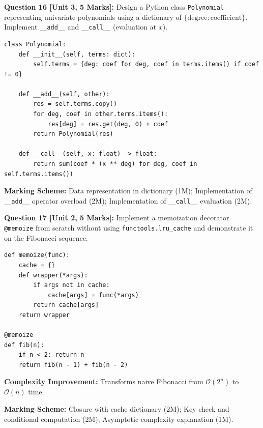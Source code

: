 \noindent\textbf{Question 16 [Unit 3, 5 Marks]:} Design a Python class \texttt{Polynomial} representing univariate polynomials using a dictionary of $\{ \text{degree}: \text{coefficient} \}$. Implement \texttt{\_\_add\_\_} and \texttt{\_\_call\_\_} (evaluation at $x$).
\begin{solutionbox}
\begin{lstlisting}
class Polynomial:
    def __init__(self, terms: dict):
        self.terms = {deg: coef for deg, coef in terms.items() if coef != 0}

    def __add__(self, other):
        res = self.terms.copy()
        for deg, coef in other.terms.items():
            res[deg] = res.get(deg, 0) + coef
        return Polynomial(res)

    def __call__(self, x: float) -> float:
        return sum(coef * (x ** deg) for deg, coef in self.terms.items())
\end{lstlisting}
\end{solutionbox}
\begin{markingrubric}
\textbf{Marking Scheme:} Data representation in dictionary (1M); Implementation of \texttt{\_\_add\_\_} operator overload (2M); Implementation of \texttt{\_\_call\_\_} evaluation (2M).
\end{markingrubric}

\noindent\textbf{Question 17 [Unit 2, 5 Marks]:} Implement a memoization decorator \texttt{@memoize} from scratch without using \texttt{functools.lru\_cache} and demonstrate it on the Fibonacci sequence.
\begin{solutionbox}
\begin{lstlisting}
def memoize(func):
    cache = {}
    def wrapper(*args):
        if args not in cache:
            cache[args] = func(*args)
        return cache[args]
    return wrapper

@memoize
def fib(n):
    if n < 2: return n
    return fib(n - 1) + fib(n - 2)
\end{lstlisting}
\textbf{Complexity Improvement:} Transforms naive Fibonacci from $\mathcal{O}(2^n)$ to $\mathcal{O}(n)$ time.
\end{solutionbox}
\begin{markingrubric}
\textbf{Marking Scheme:} Closure with cache dictionary (2M); Key check and conditional computation (2M); Asymptotic complexity explanation (1M).
\end{markingrubric}

